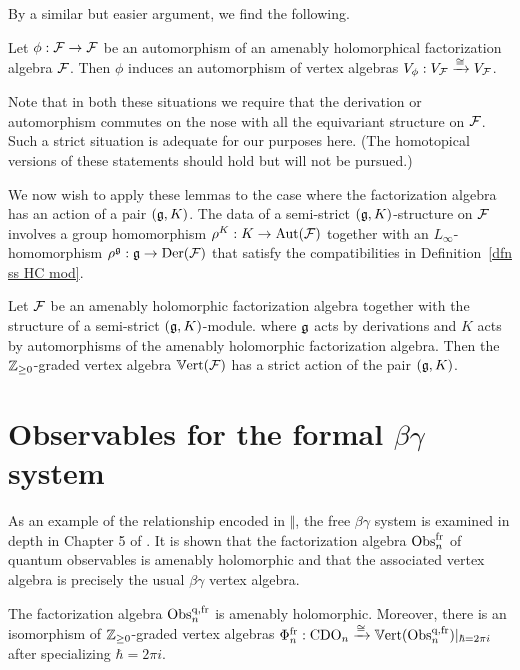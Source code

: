 By a similar but easier argument, we find the following.

\begin{lemma}
Let $\phi: \mathcal F \to \mathcal F$ be an automorphism of an amenably holomorphical factorization algebra $\mathcal F$. Then $\phi$ induces an automorphism of vertex algebras $V_\phi: V_\mathcal F \xrightarrow{\cong} V_\mathcal F$.
\end{lemma}

Note that in both these situations we require that the derivation or
automorphism commutes on the nose with all the equivariant structure on $\mathcal F$. 
Such a strict situation is adequate for our purposes here. 
(The homotopical versions of these statements should hold but will not be pursued.)

We now wish to apply these lemmas to the case where the factorization algebra has an action of a pair $(\mathfrak g,K)$. 
The data of a semi-strict $(\mathfrak g,K)$-structure on $\mathcal F$ involves a group homomorphism $\rho^K : K \to {\rm Aut}(\mathcal F)$
together with an $L_\infty$-homomorphism $\rho^\mathfrak g : \mathfrak g \to {\rm Der}(\mathcal F)$
that satisfy the compatibilities in Definition~\ref{dfn ss HC mod}. 

\begin{cor}\label{vertpair} 
Let $\mathcal F$ be an amenably holomorphic factorization algebra 
together with the structure of a semi-strict $(\mathfrak g,K)$-module. where
$\mathfrak g$ acts by derivations and $K$ acts by automorphisms of the amenably holomorphic factorization
algebra. 
Then the $\mathbb Z_{\geq 0}$-graded vertex algebra $\mathbb{V}{\rm ert}(\mathcal F)$ has a
strict action of the pair $(\mathfrak g,K)$. 
\end{cor}

\section{Observables for the formal $\beta\gamma$ system}

As an example of the relationship encoded in $\Vert$,
the free $\beta\gamma$ system is examined in depth in Chapter 5 of \cite{CG}.
It is shown that the factorization algebra ${\rm Obs}^{{\rm fr}}_n$ of quantum observables is amenably holomorphic
and that the associated vertex algebra is precisely the usual $\beta\gamma$ vertex algebra.

\begin{thm}
The factorization algebra ${\rm Obs}^{{\rm q},{\rm fr}}_n$ is amenably holomorphic. 
Moreover, 
there is an isomorphism of $\mathbb Z_{\geq 0}$-graded vertex algebras 
$\Phi^{{\rm fr}}_n : {\rm CDO}_n \xrightarrow{\cong} \mathbb{V}{\rm ert}({\rm Obs}^{{\rm q},{\rm fr}}_n)|_{\hbar= 2 \pi i}$ after specializing $\hbar=2 \pi i$.
\end{thm}

